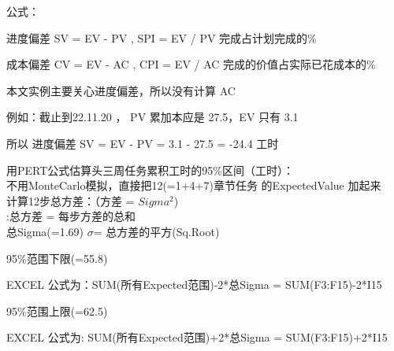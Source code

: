 公式：

\begin{description}
\tightlist
\item[]
进度偏差 SV = EV - PV , SPI = EV / PV 完成占计划完成的\%

成本偏差 CV = EV - AC , CPI = EV / AC 完成的价值占实际已花成本的\%
\end{description}

本文实例主要关心进度偏差，所以没有计算 AC

例如：截止到22.11.20 ， PV 累加本应是 27.5，EV 只有 3.1

\begin{description}
\tightlist
\item[]
所以 进度偏差 SV = EV - PV = 3.1 - 27.5 = -24.4 工时
\end{description}

用PERT公式估算头三周任务累积工时的95\%区间（工时）：\\
不用MonteCarlo模拟，直接把12(=1+4+7)章节任务 的ExpectedValue 加起来\\
计算12步总方差：（方差 = \(Sigma^2\))\\
:总方差 = 每步方差的总和\\
总Sigma(=1.69) \(\sigma\)= 总方差的平方(Sq.Root)

\begin{description}
\item[]
\end{description}

\begin{description}
\tightlist
\item[]
95\%范围下限(=55.8)

\begin{description}
\tightlist
\item[]
EXCEL 公式为：SUM(所有Expected范围)-2*总Sigma = SUM(F3:F15)-2*I15
\end{description}

95\%范围上限(=62.5)

\begin{description}
\tightlist
\item[]
EXCEL 公式为: SUM(所有Expected范围)+2*总Sigma = SUM(F3:F15)+2*I15
\end{description}
\end{description}

